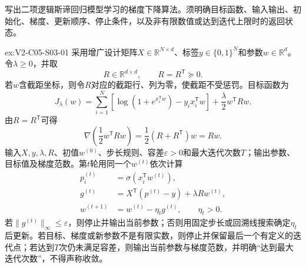 \begin{SLChapterExercisePairSection}

\SLSourceBookExercises

\begin{exercise}\label{ex:V2-C05-S03-01}
写出二项逻辑斯谛回归模型学习的梯度下降算法。须明确目标函数、输入输出、初始化、梯度、更新顺序、停止条件，以及非有限数值或达到迭代上限时的返回状态。
\end{exercise}
\ifSLFullEdition
{}\label{sol:V2-C05-S03-01}
\begin{chapterexercisesolution}{ex:V2-C05-S03-01}
采用增广设计矩阵$X\in\mathbb R^{N\times d}$、标签$y\in\{0,1\}^{N}$和参数$w\in\mathbb R^d$。令$\lambda\geq0$，并取
\[
R\in\mathbb R^{d\times d},
\qquad R=R^{\mathsf T}\succeq0.
\]
若$w$含截距坐标，则令$R$对应的截距行、列为零，使截距不受惩罚。目标函数为
\[
J_\lambda(w)=\sum_{i=1}^{N}\left[\log(1+e^{x_i^{\mathsf T}w})-y_ix_i^{\mathsf T}w\right]+\frac{\lambda}{2}w^{\mathsf T}Rw.
\]
由$R=R^{\mathsf T}$可得
\[
\nabla\!\left(\frac12w^{\mathsf T}Rw\right)
=\frac12(R+R^{\mathsf T})w
=Rw.
\]
输入$X,y,\lambda,R$、初值$w^{(0)}$、步长规则、容差$\varepsilon>0$和最大迭代次数$T$；输出参数、目标值及梯度范数。第$t$轮用同一个$w^{(t)}$依次计算
\[
\begin{aligned}
p_i^{(t)}&=\sigma\!\left(x_i^{\mathsf T}w^{(t)}\right),\\
g^{(t)}&=X^{\mathsf T}(p^{(t)}-y)+\lambda Rw^{(t)},\\
w^{(t+1)}&=w^{(t)}-\eta_tg^{(t)},\qquad \eta_t>0.
\end{aligned}
\]
若$\lVert g^{(t)}\rVert_\infty\le\varepsilon$，则停止并输出当前参数；否则用固定步长或回溯线搜索确定$\eta_t$后更新。若目标、梯度或新参数不是有限实数，则停止并保留最后一个有定义的迭代点；若达到$T$次仍未满足容差，则输出当前参数与梯度范数，并明确“达到最大迭代次数”，不得声称收敛。
\end{chapterexercisesolution}
\fi

\SLLectureSupplementExercises


\end{SLChapterExercisePairSection}
